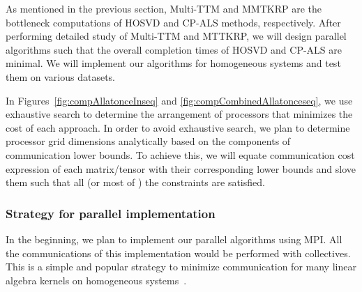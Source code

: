 \documentclass[a4paper,11pt]{article}
\begin{document}
	
	As mentioned in the previous section, Multi-TTM and MMTKRP are  the bottleneck computations of HOSVD and CP-ALS methods, respectively. After performing detailed study of Multi-TTM and MTTKRP, we will design parallel algorithms such that the overall completion times of HOSVD and CP-ALS are minimal. We will implement our algorithms for homogeneous systems and test them on various datasets. 
	
	In Figures~\ref{fig:compAllatonceInseq} and \ref{fig:compCombinedAllatonceseq}, we use exhaustive search to determine the arrangement of processors that minimizes the cost of each approach. In order to avoid exhaustive search, we plan to determine processor grid dimensions analytically based on the components of communication lower bounds. To achieve this, we will equate communication cost expression of each matrix/tensor with their corresponding lower bounds and slove them such that all (or most of ) the constraints are satisfied.
	
%	
	
	
	
	\subsubsection*{Strategy for parallel implementation}
	In the beginning, we plan to implement our parallel algorithms using MPI. All the communications of this implementation would be performed with collectives. This is a simple and popular strategy to minimize communication for many linear algebra kernels on homogeneous systems~\cite{ABK-IPDPS-2016,BKK-TOMS-2020}.
	
\end{document}
